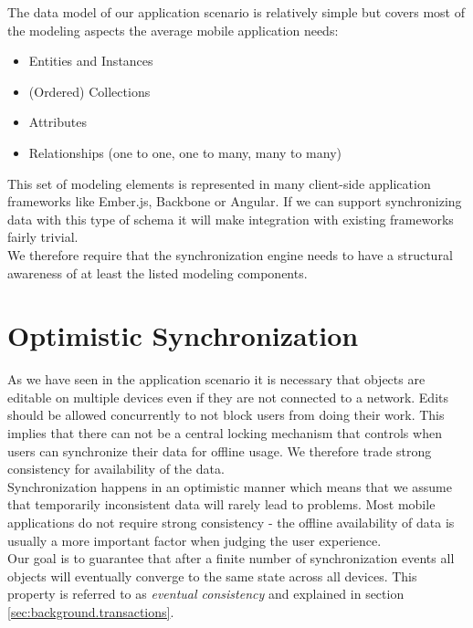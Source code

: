 The data model of our application scenario is relatively simple but covers most of the modeling aspects the average mobile application needs:

\begin{itemize}
\item Entities and Instances
\item (Ordered) Collections
\item Attributes
\item Relationships (one to one, one to many, many to many)
\end{itemize}

This set of modeling elements is represented in many client-side application frameworks like Ember.js, Backbone or Angular.
If we can support synchronizing data with this type of schema it will make integration with existing frameworks fairly trivial.\\
We therefore require that the synchronization engine needs to have a structural awareness of at least the listed modeling components.

\section{Optimistic Synchronization}
\label{sec:requirements.optimistic}
As we have seen in the application scenario it is necessary that objects are editable on multiple devices even if they are not connected to a network.
Edits should be allowed concurrently to not block users from doing their work.
This implies that there can not be a central locking mechanism that controls when users can synchronize their data for offline usage.
We therefore trade strong consistency for availability of the data.\\
Synchronization happens in an optimistic manner which means that we assume that temporarily inconsistent data will rarely lead to problems.
Most mobile applications do not require strong consistency - the offline availability of data is usually a more important factor when judging the user experience.\\
Our goal is to guarantee that after a finite number of synchronization events all objects will eventually converge to the same state across all devices.
This property is referred to as \emph{eventual consistency} and explained in section \ref{sec:background.transactions}.\\

